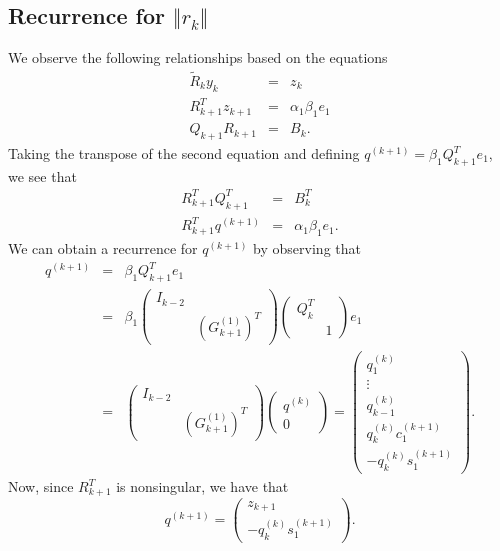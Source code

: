 \documentclass[11pt]{article}
\begin{document}
\subsection{Recurrence for $\Vert r_k \Vert$}
We observe the following relationships based on the equations
\begin{eqnarray}
\tilde{R}_k y_k &=& z_k \\
R^T_{k+1} z_{k+1} &=& \alpha_1 \beta_1 e_1 \\
Q_{k+1} R_{k+1} &=& B_k.
\end{eqnarray}
Taking the transpose of the second equation and defining $q^{(k+1)} = \beta_1 Q^T_{k+1} e_1$, we see that
\begin{eqnarray}
R^T_{k+1} Q^T_{k+1} &=& B^T_k \\
R^T_{k+1} q^{(k+1)} &=& \alpha_1 \beta_1 e_1.
\end{eqnarray}
We can obtain a recurrence for $q^{(k+1)}$ by observing that
\begin{eqnarray*}
q^{(k+1)} &=& \beta_1 Q^T_{k+1} e_1 \\
&=& \beta_1 \begin{pmatrix}
I_{k-2} & \\ & \left(G^{(1)}_{k+1}\right)^T
\end{pmatrix} \begin{pmatrix}
Q^T_{k} & \\ & 1
\end{pmatrix} e_1 \\
&=& \begin{pmatrix}
I_{k-2} & \\ & \left(G^{(1)}_{k+1}\right)^T
\end{pmatrix} \begin{pmatrix} q^{(k)} \\ 0 \end{pmatrix} = \begin{pmatrix} q^{(k)}_1 \\ \vdots \\ q^{(k)}_{k-1} \\ q^{(k)}_k c^{(k+1)}_1\\ -q^{(k)}_k s^{(k+1)}_1 \end{pmatrix}.
\end{eqnarray*}
Now, since $R^T_{k+1}$ is nonsingular, we have that
\begin{equation}
q^{(k+1)} = \begin{pmatrix}
z_{k+1} \\ -q^{(k)}_k s^{(k+1)}_1 
\end{pmatrix}.
\end{equation}
\end{document}
